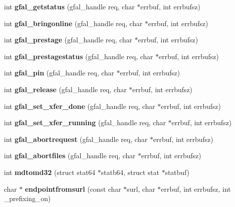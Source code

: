 \begin{CompactItemize}
\item 
int \textbf{gfal\_\-getstatus} (gfal\_\-handle req, char $\ast$errbuf, int errbufsz)\label{gfal__common_8c_847b4cc2e718a8584d02010783271921}

\item 
int \textbf{gfal\_\-bringonline} (gfal\_\-handle req, char $\ast$errbuf, int errbufsz)\label{gfal__common_8c_96ffe64861a1955b7d735e86e46be5c8}

\item 
int \textbf{gfal\_\-prestage} (gfal\_\-handle req, char $\ast$errbuf, int errbufsz)\label{gfal__common_8c_81f80cb35bbfc3702bd7219271d6e2db}

\item 
int \textbf{gfal\_\-prestagestatus} (gfal\_\-handle req, char $\ast$errbuf, int errbufsz)\label{gfal__common_8c_6fce71e0ec2a95631ef932a6d34f2438}

\item 
int \textbf{gfal\_\-pin} (gfal\_\-handle req, char $\ast$errbuf, int errbufsz)\label{gfal__common_8c_5a2a4a37c0a1148ad523f3047738f61e}

\item 
int \textbf{gfal\_\-release} (gfal\_\-handle req, char $\ast$errbuf, int errbufsz)\label{gfal__common_8c_c4c9542a65d800c8fcd1bbb9e81dadb0}

\item 
int \textbf{gfal\_\-set\_\-xfer\_\-done} (gfal\_\-handle req, char $\ast$errbuf, int errbufsz)\label{gfal__common_8c_acfca66eb49f6ba7d68b02e60bfd1e9e}

\item 
int \textbf{gfal\_\-set\_\-xfer\_\-running} (gfal\_\-handle req, char $\ast$errbuf, int errbufsz)\label{gfal__common_8c_c0e0e53b5876d28a47e163307e0e61bd}

\item 
int \textbf{gfal\_\-abortrequest} (gfal\_\-handle req, char $\ast$errbuf, int errbufsz)\label{gfal__common_8c_23a01bdcd43fb9b23a6735b27a94f701}

\item 
int \textbf{gfal\_\-abortfiles} (gfal\_\-handle req, char $\ast$errbuf, int errbufsz)\label{gfal__common_8c_82042b78955b96658c148710aed903fc}

\item 
int \textbf{mdtomd32} (struct stat64 $\ast$statb64, struct stat $\ast$statbuf)\label{gfal__common_8c_cd29b5992fa6526c74fa4d1fb630a02d}

\item 
char $\ast$ \textbf{endpointfromsurl} (const char $\ast$surl, char $\ast$errbuf, int errbufsz, int \_\-prefixing\_\-on)\label{gfal__common_8c_fb27343aaad36ce664aa6a26cac94fc2}


\end{CompactItemize}
